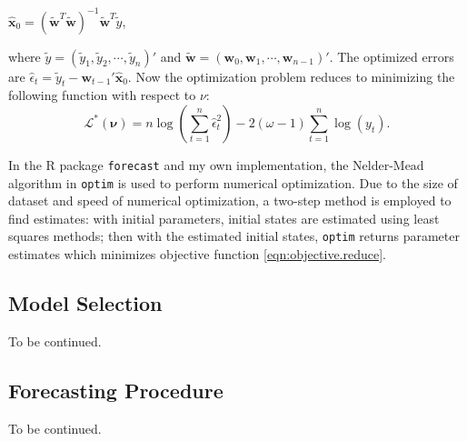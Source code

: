 \documentclass{uwstat572}
\begin{document}
\begin{center}
$\displaystyle \hat{\textbf{x}}_0 = (\tilde{\textbf{w}}^T \tilde{\textbf{w}})^{-1}\tilde{\textbf{w}}^T \tilde{y}$,
\end{center}
where $\tilde{y}=(\tilde{y}_1 ,\tilde{y}_2  , \cdots , \tilde{y}_n )' $ and $\tilde{\textbf{w}}=(\textbf{w}_0 ,\textbf{w}_1  ,\cdots , \textbf{w}_{n-1})'$. The optimized errors are $\hat{\epsilon}_t=\tilde{y}_t-\textbf{w}_{t-1}' \hat{\textbf{x}}_0$. Now the optimization problem reduces to minimizing the following function with respect to $\nu$:
\begin{equation}
\mathcal{L}^{*}(\bm{\nu})=n \log (\sum\limits_{t=1}^n \hat{\epsilon}_t^2)-2(\omega-1) \sum\limits_{t=1}^n \log(y_t).
\label{eqn:objective.reduce}
\end{equation}

In the R package \texttt{forecast} and my own implementation, the Nelder-Mead algorithm in \texttt{optim} is used to perform numerical optimization. Due to the size of dataset and speed of numerical optimization, a two-step method is employed to find estimates: with initial parameters, initial states are estimated using least squares methods; then with the estimated initial states, \texttt{optim} returns parameter estimates which minimizes objective function \ref{eqn:objective.reduce}.  

\subsection{Model Selection}
\label{sec:selection}
To be continued.
\subsection{Forecasting Procedure}
To be continued.
\nocite{*}


\end{document}
